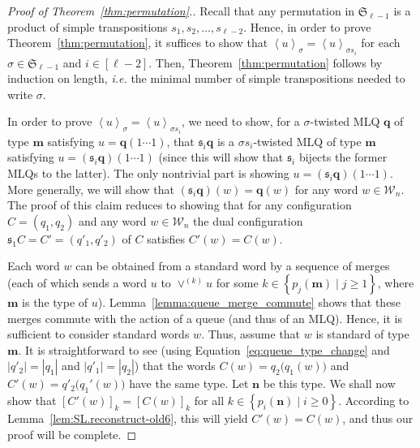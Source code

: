 \documentclass[reqno]{amsart}
\newcommand{\0}{\phantom{c}}
\newcommand{\swt}[1]{\left\langle #1 \right\rangle} %
\newcommand{\SymGp}[1]{\mathfrak{S}_{#1}} %
\newcommand{\mm}{\mathbf{m}}
\newcommand{\nn}{\mathbf{n}}
\newcommand{\qq}{\mathbf{q}}
\newcommand{\mcW}{\mathcal{W}}
\newcommand{\fraks}{\mathfrak{s}}
\newenvironment{verlong}{}{}
\newcommand{\set}[1]{\left\{ #1 \right\}}
\newcommand{\abs}[1]{\left| #1 \right|}
\newcommand{\tup}[1]{\left( #1 \right)}
\newcommand{\ive}[1]{\left[ #1 \right]}
\theoremstyle{plain}
\theoremstyle{definition}
\numberwithin{equation}{section}
\begin{document}
\begin{verlong}
\begin{proof}[Proof of Theorem~\ref{thm:permutation}.]
Recall that any permutation in $\SymGp{\ell-1}$ is a product of simple transpositions $s_1, s_2, \ldots, s_{\ell-2}$.
Hence, in order to prove Theorem~\ref{thm:permutation}, it suffices to show that $\swt{u}_{\sigma} = \swt{u}_{\sigma s_i}$ for each $\sigma \in \SymGp{\ell-1}$ and $i \in \ive{\ell-2}$.
Then, Theorem~\ref{thm:permutation} follows by induction on length, \textit{i.e.} the minimal number of simple transpositions needed to write $\sigma$.

In order to prove $\swt{u}_{\sigma} = \swt{u}_{\sigma s_i}$, we need to show, for a $\sigma$-twisted MLQ $\qq$ of type $\mm$ satisfying $u = \qq (1 \dotsm 1)$, that $\fraks_i \qq$ is a $\sigma s_i$-twisted MLQ of type $\mm$ satisfying $u = (\fraks_i \qq) (1 \dotsm 1)$ (since this will show that $\fraks_i$ bijects the former MLQs to the latter).
The only nontrivial part is showing $u = (\fraks_i\qq) (1 \dotsm 1)$.
More generally, we will show that $(\fraks_i\qq)(w) = \qq(w)$ for any word $w \in \mcW_n$.
The proof of this claim reduces to showing that for any configuration $C = \tup{q_1, q_2}$ and any word $w \in \mcW_n$ the dual configuration $\fraks_1 C = C' = (q'_1, q'_2)$ of $C$ satisfies $C'(w) = C(w)$.

Each word $w$ can be obtained from a standard word by a sequence of
merges (each of which sends a word $u$ to $\vee^{(k)} u$ for some
$k \in \set{ p_j(\mm) \mid j \geq 1 }$, where $\mm$ is the type of
$u$). Lemma~\ref{lemma:queue_merge_commute} shows that these merges
commute with the action of a queue (and thus of an MLQ).
Hence, it is sufficient to consider standard words $w$.
Thus, assume that $w$ is standard of type $\mm$.
It is straightforward to see
(using Equation~\eqref{eq:queue_type_change} and $\abs{q'_2} = \abs{q_1}$ and $\abs{q'_1} = \abs{q_2}$)
that the words
$C(w) = q_2\bigl( q_1(w) \bigr)$
and
$C'(w) = q'_2\bigl( q_1'(w) \bigr)$
have the same type.
Let $\nn$ be this type.
We shall now show that
$[C'(w)]_k = [C(w)]_k$
for all $k \in \set{ p_i(\nn) \mid i \geq 0}$.
According to Lemma~\ref{lem:SL.reconstruct-old6}, this will yield $C'(w) = C(w)$, and thus our proof will be complete.


\end{proof}
\end{verlong}
\end{document}
